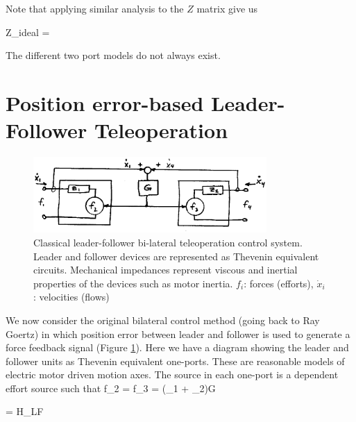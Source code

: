 Note that applying similar analysis to the $Z$ matrix give us

\bq
Z_{ideal} =  
\eq

The different two port models do not always exist.

\section{Position error-based Leader-Follower Teleoperation}

%
\begin{figure}[h]	%
\centering \includegraphics[width=3.5in]{figs14/00313.eps}
\caption{Classical leader-follower bi-lateral teleoperation control system.  Leader and follower devices are represented as Thevenin equivalent circuits.  Mechanical impedances represent viscous and inertial properties of the devices such as motor inertia. $f_i$: forces (efforts), $\dot{x}_i$: velocities (flows)}\label{ClassicalLeaderFollower}	%
\end{figure}	%

We now consider the original bilateral control method (going back to Ray Goertz) in which position error between leader and follower is used to generate a force feedback signal (Figure \ref{ClassicalLeaderFollower}).  Here we have a diagram showing the leader and follower units as Thevenin equivalent one-ports.  These are reasonable models of electric motor driven motion axes.  The source in each one-port is a dependent effort source such that
\bq
f_2 = f_3 = (_1 + _2)G
\eq


\bq\label{HMatrixDef2}
=
H_{LF}  
\eq


